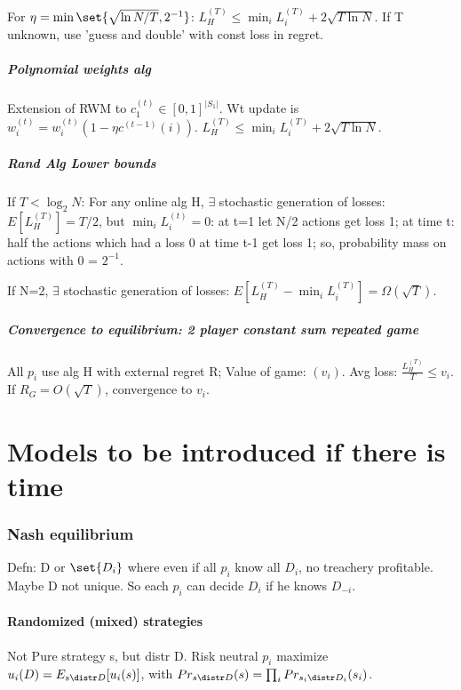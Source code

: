 \documentclass[10pt]{amsart}
\begin{document}
For $\eta = \min \set{\sqrt{\ln N/ T}, 2^{-1}}$: $L_{H}^{(T)} \leq \min_{i} L_{i}^{(T)} + 2\sqrt{T\ln N}$. If T unknown, use 'guess and double' with const loss in regret. \why

\subsubsection{Polynomial weights alg}
Extension of RWM to $c_{1}^{(t)} \in [0,1]^{|S_{1}|}$. Wt update is $w_{i}^{(t)} = w_{i}^{(t)}(1-\eta c^{(t-1)}(i))$. $L_{H}^{(T)} \leq \min_{i} L_{i}^{(T)} + 2\sqrt{T\ln N}$. \why

\subsubsection{Rand Alg Lower bounds}
If $T <  \log_{2} N$: For any online alg H, $\exists$ stochastic generation of losses: $E[L_{H}^{(T)}] = T/2$, but $\min_{i} L_{i}^{(t)} = 0$: at t=1 let N/2 actions get loss 1; at time t: half the actions which had a loss 0 at time t-1 get loss 1; so, probability mass on actions with 0 = $2^{-1}$.

If N=2, $\exists$ stochastic generation of losses: $E[L_{H}^{(T)} - \min_{i} L_{i}^{(T)}] = \Omega(\sqrt{T})$. \why

\subsubsection{Convergence to equilibrium: 2 player constant sum repeated game}
All $p_{i}$ use alg H with external regret R; Value of game: $(v_{i})$. Avg loss: $\frac{L_{H}^{(T)}}{T} \leq v_{i}$. \why If $R_{G} = O(\sqrt{T})$, convergence to $v_{i}$.

\part{Models to be introduced if there is time}
\section{Nash equilibrium}

Defn: D or $\set{D_{i}}$ where even if all $p_{i}$ know all $D_{i}$, no treachery profitable. Maybe D not unique. So each $p_{i}$ can decide $D_{i}$ if he knows $D_{-i}$.

\subsection{Randomized (mixed) strategies} Not Pure strategy s, but distr D. Risk neutral $p_{i}$ maximize $u_{i}(D) = E_{s \distr D}[u_{i}(s)]$, with $Pr_{s \distr D}(s) = \prod_{i} Pr_{s_{i} \distr D_{i}}(s_{i})$.
\end{document}
